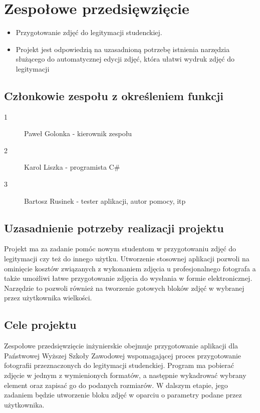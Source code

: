 \chapter{Zespołowe przedsięwzięcie}

\begin{itemize}
\item Przygotowanie zdjęć do legitymacji studenckiej. 
\item Projekt jest odpowiedzią na uzasadnioną potrzebę istnienia narzędzia służącego do automatycznej edycji zdjęć, która ułatwi wydruk zdjęć do legitymacji
\end{itemize}

\section{Członkowie zespołu z określeniem funkcji}
\begin{description}
\item[1] Paweł Golonka - kierownik zespołu
\item[2] Karol Liszka - programista C\#	
\item[3] Bartosz Rusinek - tester aplikacji, autor pomocy, itp
\end{description}

\section{Uzasadnienie potrzeby realizacji projektu}
Projekt ma za zadanie pomóc nowym studentom w przygotowaniu zdjęć do legitymacji czy też do innego użytku. Utworzenie stosownej aplikacji pozwoli na ominięcie kosztów związanych z wykonaniem zdjęcia u profesjonalnego fotografa a także umożliwi łatwe przygotowanie zdjęcia do wysłania w formie elektronicznej. Narzędzie to pozwoli również na tworzenie gotowych  bloków zdjęć w wybranej przez użytkownika wielkości.


\section{Cele projektu}

Zespołowe przedsięwzięcie inżynierskie obejmuje przygotowanie aplikacji dla Państwowej Wyższej Szkoły Zawodowej wspomagającej proces przygotowanie fotografii przeznaczonych do legitymacji studenckiej. Program ma pobierać zdjęcie w jednym z wymienionych formatów, a następnie wykadrować wybrany element oraz zapisać go do podanych rozmiarów. 
W dalszym etapie, jego zadaniem będzie utworzenie bloku zdjęć w oparciu o parametry podane przez użytkownika.

